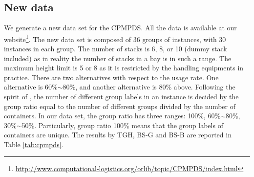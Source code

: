 \documentclass[review,3p,times,authoryear,12pt]{elsarticle}
\begin{document}
\subsection {New data}
We generate a new data set for the CPMPDS. All the data is available at our website\footnote{\url{http://www.computational-logistics.org/orlib/topic/CPMPDS/index.html}}. The new data set is composed of 36 groups of instances, with 30 instances in each group. The number of stacks is 6, 8, or 10 (dummy stack included) as in reality the number of stacks in a bay is in such a range. The maximum height limit is 5 or 8 as it is restricted by the handling equipments in practice. There are two alternatives with respect to the usage rate. One alternative is 60\%$\sim$80\%, and another alternative is 80\% above. Following the spirit of \cite{BF2012}, the number of different group labels in an instance is decided by the group ratio equal to the number of different groups divided by the number of containers. In our data set, the group ratio has three ranges: 100\%, 60\%$\sim$80\%, 30\%$\sim$50\%. Particularly, group ratio 100\% means that the group labels of containers are unique. The results by TGH, BS-G and BS-B are reported in Table \ref{tab:cpmpds}.
\end{document}
